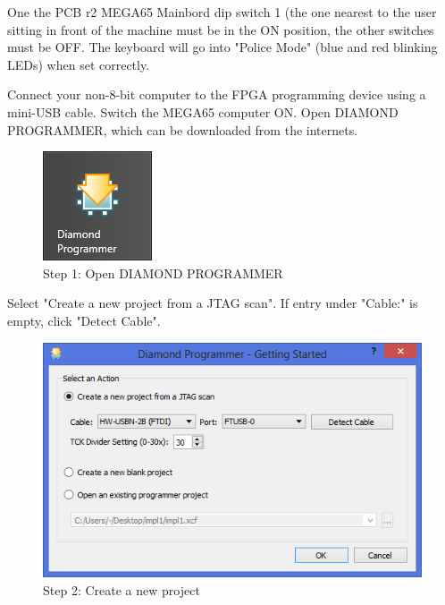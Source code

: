 One the PCB r2 MEGA65 Mainbord dip switch 1 (the one nearest to the user sitting in front of the machine
must be in the ON position, the other switches must be OFF. The keyboard will go into "Police Mode"
(blue and red blinking LEDs) when set correctly.

Connect your non-8-bit computer to the FPGA programming device using a mini-USB cable. Switch
the MEGA65 computer ON. Open DIAMOND PROGRAMMER, which can be downloaded from the internets.

\begin{figure}
  \includegraphics[width=\linewidth]{images/diamond01.png}
  \caption{Step 1: Open DIAMOND PROGRAMMER}
  \label{fig:diamond01}
\end{figure}

Select "Create a new project from a JTAG scan". If entry under "Cable:" is empty, click "Detect Cable".

\begin{figure}
  \includegraphics[width=\linewidth]{images/diamond02.png}
  \caption{Step 2: Create a new project}
  \label{fig:diamond02}
\end{figure}

